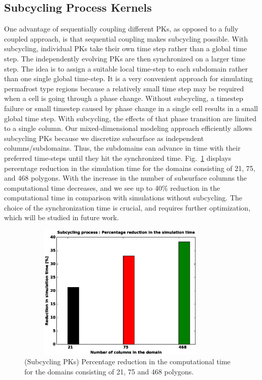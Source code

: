 \documentclass[review,11pt]{elsarticle}
\begin{document}
\subsection{Subcycling Process Kernels}
One advantage of sequentially coupling different PKs, as opposed to a fully coupled approach, is that sequential coupling makes subcycling possible. With subcycling, individual PKs take their own time step rather than a global time step. The independently evolving PKs are then synchronized on a larger time step. The idea is to assign a suitable local time-step to each subdomain rather than one single global time-step. It is a very convenient approach for simulating permafrost type regions because a relatively small time step may be required when a cell is going through a phase change. Without subcycling, a timestep failure or small timestep caused by phase change in a single cell results in a small global time step. With subcycling, the effects of that phase transition are limited to a single column.  Our mixed-dimensional modeling approach efficiently allows subcycling PKs because we discretize subsurface as independent columns/subdomains. Thus, the subdomains can advance in time with their preferred time-steps until they hit the synchronized time. Fig.~\ref{subcycle-time-reduciton} displays percentage reduction in the simulation time for the domains consisting of 21, 75, and 468 polygons. With the increase in the number of subsurface columns the computational time decreases, and we see up to 40\% reduction in the computational time in comparison with simulations without subcycling. The choice of the synchronization time is crucial, and requires further optimization, which will be studied in future work.

\begin{figure}[!htpb]
\centering
\includegraphics[height = 6.5cm, width=10cm]{figures/subcycle-time-reduciton.eps}
\caption{(Subcycling PKs) Percentage reduction in the computational time for the domains consisting of 21, 75 and 468 polygons. }
\label{subcycle-time-reduciton}
\end{figure}
\end{document}
